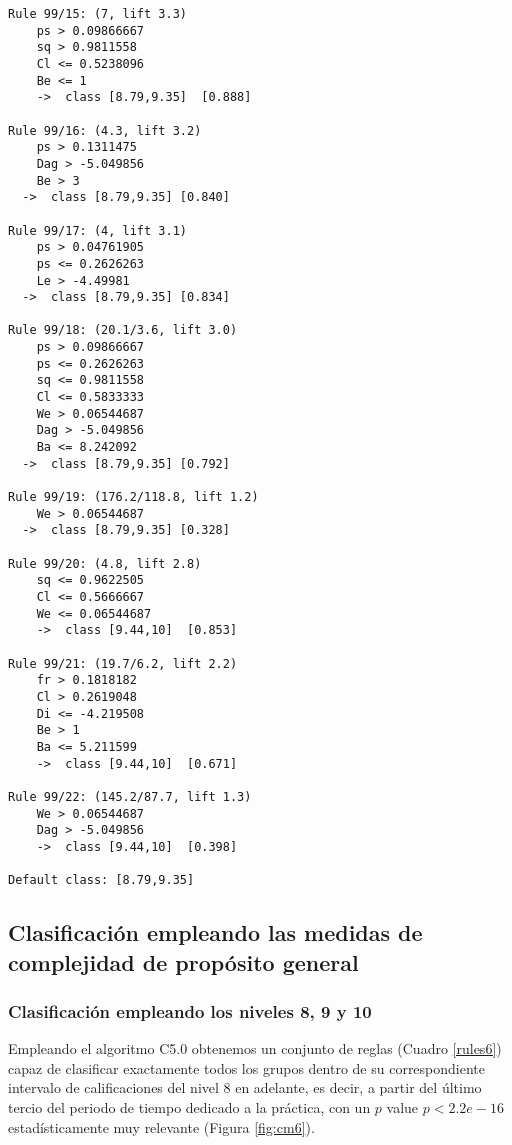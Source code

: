 \begin{tcolorbox}[title=Reglas de clasificación para identificar intervalos de notas.]
\begin{multicols}{3}
\begin{verbatim}
Rule 99/15: (7, lift 3.3)
	ps > 0.09866667
	sq > 0.9811558
	Cl <= 0.5238096
	Be <= 1
	->  class [8.79,9.35]  [0.888]

Rule 99/16: (4.3, lift 3.2)
	ps > 0.1311475
	Dag > -5.049856
	Be > 3
  ->  class [8.79,9.35] [0.840]

Rule 99/17: (4, lift 3.1)
	ps > 0.04761905
	ps <= 0.2626263
	Le > -4.49981
  ->  class [8.79,9.35] [0.834]

Rule 99/18: (20.1/3.6, lift 3.0)
	ps > 0.09866667
	ps <= 0.2626263
	sq <= 0.9811558
	Cl <= 0.5833333
	We > 0.06544687
	Dag > -5.049856
	Ba <= 8.242092
  ->  class [8.79,9.35] [0.792]

Rule 99/19: (176.2/118.8, lift 1.2)
	We > 0.06544687
  ->  class [8.79,9.35] [0.328]

Rule 99/20: (4.8, lift 2.8)
	sq <= 0.9622505
	Cl <= 0.5666667
	We <= 0.06544687
	->  class [9.44,10]  [0.853]

Rule 99/21: (19.7/6.2, lift 2.2)
	fr > 0.1818182
	Cl > 0.2619048
	Di <= -4.219508
	Be > 1
	Ba <= 5.211599
	->  class [9.44,10]  [0.671]

Rule 99/22: (145.2/87.7, lift 1.3)
	We > 0.06544687
	Dag > -5.049856
	->  class [9.44,10]  [0.398]
	
Default class: [8.79,9.35]
    \end{verbatim}
  \end{multicols}
\label{rules7}
\end{tcolorbox}

\subsection{Clasificación empleando las medidas de complejidad de propósito general}

\subsubsection{Clasificación empleando los niveles 8, 9 y 10}

Empleando el algoritmo C5.0 obtenemos un conjunto de reglas (Cuadro \ref{rules6}) capaz de clasificar exactamente todos los grupos dentro de su correspondiente intervalo de calificaciones del nivel $8$ en adelante, es decir, a partir del último tercio del periodo de tiempo dedicado a la práctica, con un $p$ value $p < 2.2e-16$ estadísticamente muy relevante (Figura \ref{fig:cm6}).

